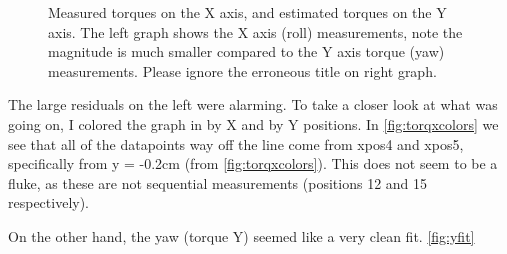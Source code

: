 \documentclass[preprint,12pt,3p]{elsarticle}
\begin{document}
\begin{figure}[tb!]
    \centering 
        \hfil %
        \hfil
        \caption{Measured torques on the X axis, and estimated torques on the Y axis.
            The left graph shows the X axis (roll) measurements, note the magnitude is much smaller
        compared to the Y axis torque (yaw) measurements. Please ignore the erroneous title on right graph.}
    \label{fig:nocolor}
\end{figure}


The large residuals on the left were alarming. To take a closer look at what was going on, I colored
the graph in by X and by Y positions. In \cref{fig:torqxcolors} we see that all of the datapoints way off the
line come from xpos4 and xpos5, specifically from y = -0.2cm (from  \cref{fig:torqxcolors}). This does not
seem to be a fluke, as these are not sequential measurements (positions 12 and 15 respectively).

On the other hand, the yaw (torque Y) seemed like a very clean fit. \cref{fig:yfit}

\end{document}
